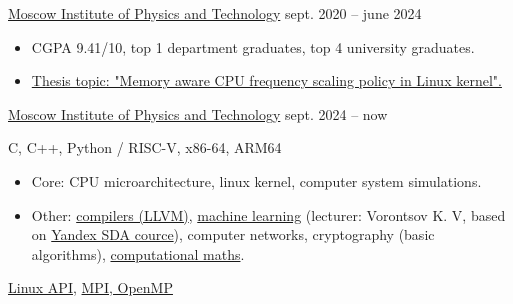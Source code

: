        {\href{https://mipt.ru}{Moscow Institute of Physics and Technology}}
        {sept. 2020 -- june 2024}{}

    \begin{itemize}
        \item CGPA 9.41/10, top 1 department graduates, top 4 university graduates.
        \item \href{https://github.com/Vokerlee/macfm-governor-thesis/blob/master/thesis/ru/thesis.pdf}
                   {Thesis topic: "Memory aware CPU frequency scaling policy in Linux kernel".}
    \end{itemize}

        {\href{https://mipt.ru}{Moscow Institute of Physics and Technology}}
        {sept. 2024 -- now}{}


    C, C++, Python / RISC-V, x86-64, ARM64
    \smallskip

    \begin{itemize}
        \item Core: CPU microarchitecture, linux kernel, computer system simulations.
        \item Other: \href{https://github.com/Vokerlee/riscv64-simulator/tree/griscv_llvm_sim}{compilers (LLVM)}, 
            \href{https://github.com/Vokerlee/machine-learning-mipt}{machine learning} (lecturer: Vorontsov K. V, based on
            \href{https://dataschool.yandex.com}{Yandex SDA cource}), computer networks,
            cryptography (basic algorithms),
            \href{https://github.com/Vokerlee/computational-maths-mipt}{computational maths}.
    \end{itemize}
    \smallskip

    \href{https://github.com/Vokerlee/linux-api-course}{Linux API},
    \href{https://github.com/Vokerlee/parallel-computing-mipt}{MPI, OpenMP}
    \smallskip

